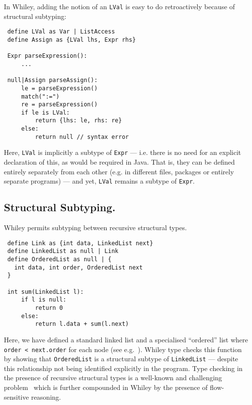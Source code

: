 In Whiley, adding the notion of an \lstinline{LVal} is easy to do
retroactively because of structural subtyping:

\begin{lstlisting}
 define LVal as Var | ListAccess 
 define Assign as {LVal lhs, Expr rhs}
 
 Expr parseExpression():
     ...

 null|Assign parseAssign():
     le = parseExpression()
     match(":=")
     re = parseExpression()
     if le is LVal:
         return {lhs: le, rhs: re}
     else:
         return null // syntax error
\end{lstlisting}
Here, \lstinline{LVal} is implicitly a subtype of \lstinline{Expr} ---
i.e. there is no need for an explicit declaration of this, as would be
required in Java.  That is, they can be defined entirely separately
from each other (e.g. in different files, packages or entirely
separate programs) --- and yet, \lstinline{LVal} remains a subtype of
\lstinline{Expr}.

\subsection{Structural Subtyping.}
Whiley permits subtyping between recursive structural types.
\begin{lstlisting}
 define Link as {int data, LinkedList next}
 define LinkedList as null | Link
 define OrderedList as null | {
   int data, int order, OrderedList next
 }

 int sum(LinkedList l):
     if l is null:
         return 0
     else:
         return l.data + sum(l.next)
\end{lstlisting}
Here, we have defined a standard linked list and a specialised
``ordered'' list where \lstinline{order < next.order} for each node
(see e.g.~\cite{DS87}).  Whiley type checks this function by showing
that \lstinline{OrderedList} is a structural subtype of
\lstinline{LinkedList} --- despite this relationship not being
identified explicitly in the program.  Type checking in the presence
of recursive structural types is a well-known and challenging
problem~\cite{GLP02,CA93,KPS93} which is further compounded in Whiley
by the presence of flow-sensitive reasoning.

